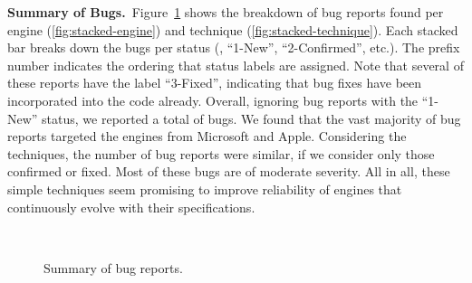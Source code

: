 \documentclass[10pt,conference,anonymous]{IEEEtran}
\begin{document}

\vspace{1ex}
\noindent\textbf{Summary of Bugs.}~Figure~\ref{fig:summary} shows the
breakdown of bug reports found per engine (\ref{fig:stacked-engine})
and technique (\ref{fig:stacked-technique}). Each stacked bar breaks
down the bugs per status (\eg{}, ``1-New'', ``2-Confirmed'',
etc.). The prefix number indicates the ordering that status labels are
assigned. Note that several of these reports have the label
``3-Fixed'', indicating that bug fixes have been incorporated into the
code already. Overall, ignoring
bug reports with the ``1-New'' status, we reported a total of
\totalBugsConfirmed{} bugs. We found that the vast majority of bug
reports targeted the engines from Microsoft and Apple. Considering the
techniques, the number of bug reports were similar, if we consider
only those confirmed or fixed. Most of these bugs are of moderate
severity. All in all, these simple techniques seem promising to
improve reliability of engines that continuously evolve with their
specifications.

\begin{figure}[h!]
  \centering
  \\
  \caption{\label{fig:summary}Summary of bug reports.}
\end{figure}
\end{document}
